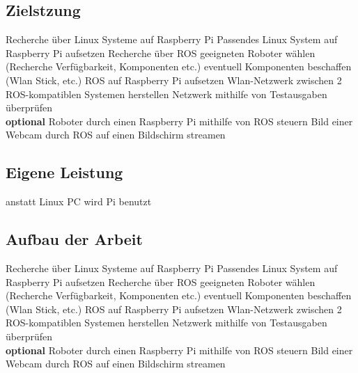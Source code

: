 \documentclass[12pt]{article}
\begin{document}







\subsection{Zielstzung}

Recherche über Linux Systeme auf Raspberry Pi
Passendes Linux System auf Raspberry Pi aufsetzen					
Recherche über ROS									
geeigneten Roboter wählen (Recherche Verfügbarkeit, Komponenten etc.)	
eventuell Komponenten beschaffen (Wlan Stick, etc.)				
ROS auf Raspberry Pi aufsetzen		
Wlan-Netzwerk zwischen 2 ROS-kompatiblen Systemen herstellen
Netzwerk mithilfe von Testausgaben überprüfen \\

{\bf optional}
Roboter durch einen Raspberry Pi mithilfe von ROS steuern
Bild einer Webcam durch ROS auf einen Bildschirm streamen

\subsection{Eigene Leistung}

anstatt Linux PC wird Pi benutzt

\subsection{Aufbau der Arbeit}

Recherche über Linux Systeme auf Raspberry Pi
Passendes Linux System auf Raspberry Pi aufsetzen					
Recherche über ROS									
geeigneten Roboter wählen (Recherche Verfügbarkeit, Komponenten etc.)	
eventuell Komponenten beschaffen (Wlan Stick, etc.)				
ROS auf Raspberry Pi aufsetzen		
Wlan-Netzwerk zwischen 2 ROS-kompatiblen Systemen herstellen
Netzwerk mithilfe von Testausgaben überprüfen \\

{\bf optional}
Roboter durch einen Raspberry Pi mithilfe von ROS steuern
Bild einer Webcam durch ROS auf einen Bildschirm streamen
\end{document}

